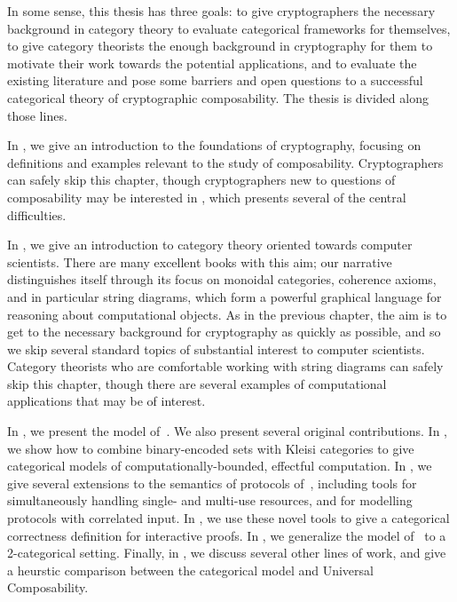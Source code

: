 In some sense, this thesis has three goals: to give cryptographers the necessary
background in category theory to evaluate categorical frameworks for themselves,
to give category theorists the enough background in cryptography for them to
motivate their work towards the potential applications, and to evaluate the
existing literature and pose some barriers and open questions to a successful
categorical theory of cryptographic composability. The thesis is divided along
those lines.

In , we give an introduction
to the foundations of cryptography, focusing on definitions and examples
relevant to the study of composability. Cryptographers can safely skip this
chapter, though cryptographers new to questions of composability may be
interested in , which
presents several of the central difficulties.

In , we give an
introduction to category theory oriented towards computer scientists. There are
many excellent books with this aim; our narrative distinguishes itself through
its focus on monoidal categories, coherence axioms, and in particular string
diagrams, which form a powerful graphical language for reasoning about
computational objects. As in the previous chapter, the aim is to get to the
necessary background for cryptography as quickly as possible, and so we skip
several standard topics of substantial interest to computer scientists. Category
theorists who are comfortable working with string diagrams can safely skip this
chapter, though there are several examples of computational applications that
may be of interest.

In ,
we present the model of~\cite{broadbent-karvonen-2022}. We also present several
original contributions.
In , we
show how to combine binary-encoded sets with Kleisi categories to give
categorical models of computationally-bounded, effectful computation. In
, we give
several extensions to the semantics of protocols
of~\cite{broadbent-karvonen-2022}, including tools for simultaneously handling
single- and multi-use resources, and for modelling protocols with correlated
input. In ,
we use these novel tools to give a categorical correctness definition for
interactive proofs. In
, we
generalize the model of~\cite{broadbent-karvonen-2022} to a 2-categorical
setting. Finally, in , we discuss
several other lines of work, and give a heurstic comparison between the
categorical model and Universal Composability.

